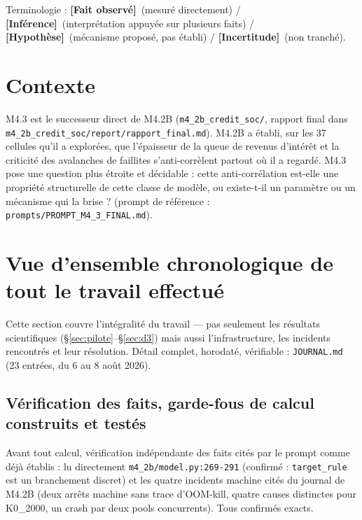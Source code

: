 \documentclass[11pt,a4paper]{article}
\newcommand{\code}[1]{\texttt{#1}}
\newcommand{\fait}{\textbf{[Fait observé]}}
\newcommand{\inference}{\textbf{[Inférence]}}
\newcommand{\hyp}{\textbf{[Hypothèse]}}
\newcommand{\incertitude}{\textbf{[Incertitude]}}
\begin{document}
\bigskip
\noindent Terminologie : \fait\ (mesuré directement) / \inference\
(interprétation appuyée sur plusieurs faits) / \hyp\ (mécanisme proposé,
pas établi) / \incertitude\ (non tranché).

\section{Contexte}

M4.3 est le successeur direct de M4.2B (\code{m4\_2b\_credit\_soc/},
rapport final dans \code{m4\_2b\_credit\_soc/report/rapport\_final.md}).
M4.2B a établi, sur les 37 cellules qu'il a explorées, que l'épaisseur de
la queue de revenus d'intérêt et la criticité des avalanches de faillites
s'anti-corrèlent partout où il a regardé. M4.3 pose une question plus
étroite et décidable : cette anti-corrélation est-elle une propriété
structurelle de cette classe de modèle, ou existe-t-il un paramètre ou un
mécanisme qui la brise ? (prompt de référence :
\code{prompts/PROMPT\_M4\_3\_FINAL.md}).

\section{Vue d'ensemble chronologique de tout le travail effectué}

Cette section couvre l'intégralité du travail --- pas seulement les
résultats scientifiques (\S\ref{sec:pilote}--\S\ref{sec:d3}) mais aussi
l'infrastructure, les incidents rencontrés et leur résolution. Détail
complet, horodaté, vérifiable : \code{JOURNAL.md} (23 entrées, du
6 au 8 août 2026).

\subsection{Vérification des faits, garde-fous de calcul construits et testés}

Avant tout calcul, vérification indépendante des faits cités par le
prompt comme déjà établis : lu directement \code{m4\_2b/model.py:269-291}
(confirmé : \code{target\_rule} est un branchement discret) et les quatre
incidents machine cités du journal de M4.2B (deux arrêts machine sans
trace d'OOM-kill, quatre causes distinctes pour K0\_2000, un crash par
deux pools concurrents). Tous confirmés exacts.
\end{document}
